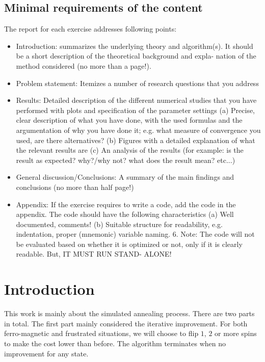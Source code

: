 \documentclass[10pt,a4paper]{article}
\begin{document}
\subsection{Minimal requirements of the content}
The report for each exercise addresses following points:
\begin{itemize}
\item Introduction: summarizes the underlying theory and algorithm(s). It should be a short description of the theoretical background and expla- nation of the method considered (no more than a page!).
\item Problem statement: Itemizes a number of research questions that you address
\item Results: Detailed description of the different numerical studies that you have performed with plots and specification of the parameter settings (a) Precise, clear description of what you have done, with the used formulas and the argumentation of why you have done it; e.g. what measure of convergence you used, are there alternatives? (b) Figures with a detailed explanation of what the relevant results are (c) An analysis of the results (for example: is the result as expected? why?/why not? what does the result mean? etc...)
\item General discussion/Conclusions: A summary of the main findings and conclusions (no more than half page!)
\item Appendix: If the exercise requires to write a code, add the code in the appendix. The code should have the following characteristics (a) Well documented, comments! (b) Suitable structure for readability, e.g. indentation, proper (mnemonic) variable naming. 6. Note: The code will not be evaluated based on whether it is optimized or not, only if it is clearly readable. But, IT MUST RUN STAND- ALONE!
\end{itemize}

\color{black}
\fi

\newpage
\tableofcontents

\newpage
\section{Introduction}
This work is mainly about the simulated annealing process. There are two parts in total. The first part mainly considered the iterative improvement. For both ferro-magnetic and frustrated situations, we will choose to flip $1$, $2$ or more spins to make the cost lower than before. The algorithm terminates when no improvement for any state.
\end{document}
